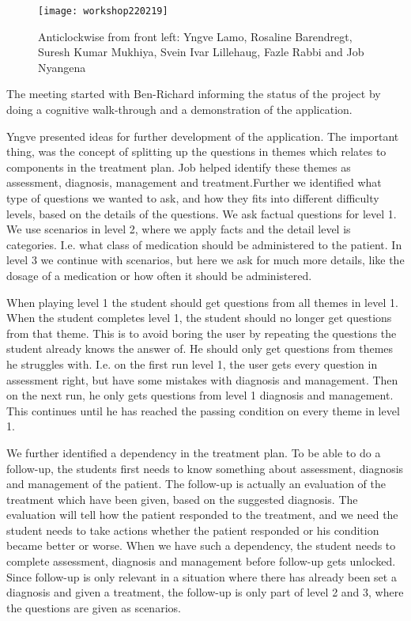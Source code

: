\begin{figure}[h!]
	\caption {Anticlockwise from front left: Yngve Lamo, Rosaline Barendregt, Suresh Kumar Mukhiya, Svein Ivar Lillehaug, Fazle Rabbi and Job Nyangena}
	\texttt{[image: workshop220219]}
\end{figure}

The meeting started with Ben-Richard informing the status of the project by doing a cognitive walk-through and a demonstration of the application. 

Yngve presented ideas for further development of the application. The important thing, was the concept of splitting up the questions in themes which relates to components in the treatment plan. Job helped identify these themes as assessment, diagnosis, management and treatment.Further we identified what type of questions we wanted to ask, and how they fits into different difficulty levels, based on the details of the questions. We ask factual questions for level 1. We use scenarios in level 2, where we apply facts and the detail level is categories. I.e. what class of medication should be administered to the patient. In level 3 we continue with scenarios, but here we ask for much more details, like the dosage of a medication or how often it should be administered.

When playing level 1 the student should get questions from all themes in level 1. When the student completes level 1, the student should no longer get questions from that theme. This is to avoid boring the user by repeating the questions the student already knows the answer of. He should only get questions from themes he struggles with. I.e. on the first run level 1, the user gets every question in assessment right, but have some mistakes with diagnosis and management. Then on the next run, he only gets questions from level 1 diagnosis and management. This continues until he has reached the passing condition on every theme in level 1. 

We further identified a dependency in the treatment plan. To be able to do a follow-up, the students first needs to know something about assessment, diagnosis and management of the patient. The follow-up is actually an evaluation of the treatment which have been given, based on the suggested diagnosis. The evaluation will tell how the patient responded to the treatment, and we need the student needs to take actions whether the patient responded or his condition became better or worse. When we have such a dependency, the student needs to complete assessment, diagnosis and management before follow-up gets unlocked. Since follow-up is only relevant in a situation where there has already been set a diagnosis and given a treatment, the follow-up is only part of level 2 and 3, where the questions are given as scenarios.

